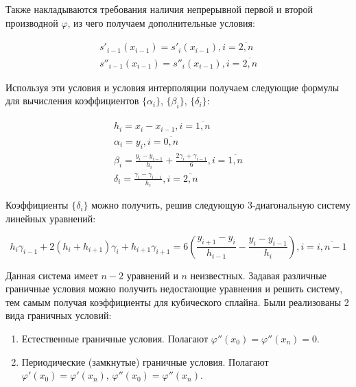 Также накладываются требования наличия непрерывной первой и второй производной $\varphi$, из чего получаем дополнительные условия:


\begin{equation}
  \begin{gathered}
    s'_{i-1}(x_{i-1}) = s'_i(x_{i-1}), i = \overline{2, n} \\
    s''_{i-1}(x_{i-1}) = s''_i(x_{i-1}), i = \overline{2, n}
  \end{gathered}
\end{equation}

Используя эти условия и условия интерполяции получаем следующие формулы для вычисления коэффициентов $\{\alpha_i\}$, $\{\beta_i\}$, $\{\delta_i\}$:

\begin{equation}
  \begin{gathered}
    h_i = x_i - x_{i-1}, i = \overline{1, n} \\
    \alpha_i = y_i, i = \overline{0, n} \\
    \beta_i = \frac{y_i - y_{i-1}}{h_i} + \frac{2\gamma_i + \gamma_{i - 1}}{6}, i = \overline{1, n} \\
    \delta_i = \frac{\gamma_i - \gamma_{i-1}}{h_i}, i = \overline{2, n}
  \end{gathered}
\end{equation}

Коэффициенты $\{\delta_i\}$ можно получить, решив следующую 3-диагональную систему линейных уравнений:

\begin{equation}
  h_i \gamma_{i-1} + 2(h_i + h_{i+1})\gamma_i + h_{i+1}\gamma_{i+1} =
  6 (\frac{y_{i+1} - y_i}{h_{i-1}} - \frac{y_i - y_{i-1}}{h_i}), i = \overline{i, n - 1}
\end{equation}

Данная система имеет $n-2$ уравнений и $n$ неизвестных. Задавая различные граничные условия можно получить недостающие уравнения и решить систему, тем самым получая коэффициенты для кубического сплайна. Были реализованы 2 вида граничных условий:

\begin{enumerate}
\item Естественные граничные условия. Полагают $\varphi''(x_0)= \varphi''(x_n)=0$.
\item Периодические (замкнутые) граничные условия. Полагают $\varphi'(x_0)=\varphi'(x_n)$, $ \varphi''(x_0)=\varphi''(x_n)$.
\end{enumerate}

